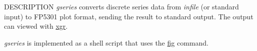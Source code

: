 \begin{synopsis}
\item[gseries] [ --F $F$] [ --s $S$ ] [ --e $E$ ] [ --n $N$ ] [ --i $I$ ] [ --y $ymax$ ]
               [ --y2 $ymin$ ] [--m $M$ ] 
\item[\ ~~~~~~~~] [ --p $P$ ] [ --magic $magic$ ] [ --MAGIC $MAGIC$ ] [ +{\em type} ]  [ {\em infile} ]

\end{synopsis}

\begin{qsection}{DESCRIPTION}
{\em gseries} converts discrete series data
from {\em infile} (or standard input) to FP5301 plot format, 
sending the result to standard output. 
The output can viewed with \hyperlink{xgr}{xgr}.

{\em gseries} is implemented as a shell script 
that uses the \hyperlink{fig}{fig} command.
\end{qsection}

